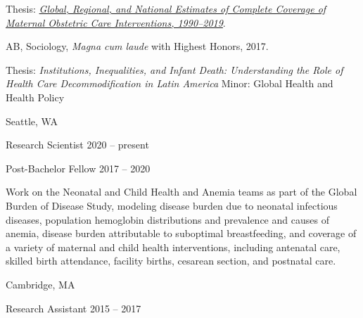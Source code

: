 \documentclass[11pt,article,oneside]{memoir}
\begin{document}
\ind \hspace{0.35in} \footnotesize Thesis: \href{https://www.proquest.com/openview/e41ccfd9cef6b7376c1218dc0080b575/1?pq-origsite=gscholar&cbl=18750&diss=y}{\emph{Global, Regional, and National Estimates of Complete Coverage of Maternal \newline Obstetric Care
	Interventions, 1990--2019}}.\normalsize 

\medskip
{}

\ind AB, Sociology, \emph{Magna cum laude} with Highest Honors, 2017.

\ind \hspace{0.35in} \footnotesize Thesis: \emph{Institutions, Inequalities, and Infant Death: Understanding the Role of Health Care \newline
Decommodification in Latin America} \newline Minor: Global Health and Health Policy \normalsize \vspace{0.01in}

\bigskip


 \hfill Seattle, WA

\ind Research Scientist \hfill 2020 -- present

\ind Post-Bachelor Fellow\vspace{0.02in} \hfill 2017 -- 2020

{\noindent \footnotesize Work on the Neonatal and Child Health and Anemia teams as part of the Global Burden of Disease Study, modeling disease
burden due to neonatal infectious diseases, population hemoglobin distributions and prevalence and causes of anemia, disease burden attributable
to suboptimal breastfeeding, and coverage of a variety of maternal and child health interventions, including antenatal care, skilled birth attendance,
facility births, cesarean section, and postnatal care.} 

\bigskip

 \hfill Cambridge, MA

\ind Research Assistant\vspace{0.02in} \hfill 2015 -- 2017
\end{document}

